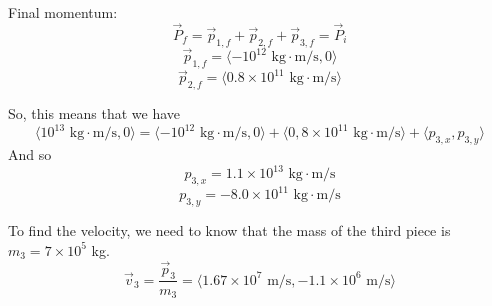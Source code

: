 Final momentum:
$$\vec{P}_f=\vec{p}_{1,f}+\vec{p}_{2,f}+\vec{p}_{3,f}=\vec{P}_i$$
$$\vec{p}_{1,f}=\langle{-10^{12}\mbox{ kg}\cdot\mbox{m/s},0}\rangle$$
$$\vec{p}_{2,f}=\langle{0.8\times 10^{11}\mbox{ kg}\cdot\mbox{m/s}}\rangle$$

So, this means that we have
$$\langle{10^{13}\mbox{ kg}\cdot\mbox{m/s},0}\rangle=\langle{-10^{12}\mbox{ kg}\cdot\mbox{m/s},0}\rangle+\langle{0,8\times 10^{11}\mbox{ kg}\cdot\mbox{m/s}}\rangle+\langle{p_{3,x},p_{3,y}}\rangle$$
And so
$$p_{3,x}=1.1\times 10^{13}\mbox{ kg}\cdot\mbox{m/s}$$
$$p_{3,y}=-8.0\times 10^{11}\mbox{ kg}\cdot\mbox{m/s}$$

To find the velocity, we need to know that the mass of the third piece is $m_3=7\times 10^5$ kg.
$$\vec{v}_3=\frac{\vec{p}_3}{m_3}=\langle{1.67\times 10^7\mbox{ m/s},-1.1\times 10^6\mbox{ m/s}}\rangle$$

\clearpage
